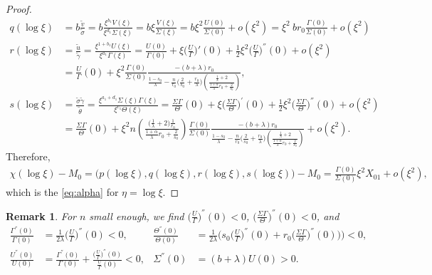 \documentclass[a4paper,11pt]{article}
\def\tg{{\tilde{\gamma}}}
\def\tv{{\tilde{v}}}
\def\tth{{\tilde{\theta}}}
\def\ts{{\tilde{\sigma}}}
\def\tu{{\tilde{u}}}
\newtheorem{remark}{Remark}[section]
\begin{document}
\begin{proof}
\begin{align*}
 q(\log\xi) &= b\frac{\tv}{\ts} = b\frac{ \xi^{b_1} V(\xi) }{ \xi^{d_1} \Sigma(\xi)} = b\xi\frac{ V(\xi) }{ \Sigma(\xi)} = b\xi^2 \frac{U(0)}{\Sigma(0)}+ o(\xi^2)=\xi^2 ~br_0\frac{\Gamma(0)}{\Sigma(0)} + o(\xi^2) \\
 r(\log\xi) &= \frac{\tu}{ \tg } = \frac{ \xi^{1+b_1}U(\xi) }{ \xi^{a_1}\Gamma(\xi) } = \frac{ U(0) }{ \Gamma(0) }+ \xi \Big(\frac{U}{\Gamma}\Big)'(0) + \frac{1}{2}\xi^2\Big(\frac{U}{\Gamma}\Big)^{''}(0) + o(\xi^2)\\
  &=\frac{ U }{ \Gamma }(0) + \xi^2\frac{\Gamma(0)}{\Sigma(0)} \frac{-(b+\lambda)r_0}{\frac{1-s_0}{\lambda}-\frac{n}{r_0}\Big(\frac{2}{s_0} + \frac{r_0}{\lambda}\Big)\left(\frac{ \frac{1}{\lambda}+2}{ \frac{1+\alpha}{\lambda}r_0 + \frac{2}{s_0}}\right)} ,\\
 s(\log\xi) &= \frac{\ts\tg}{\tth} = \frac{ \xi^{a_1+d_1}\Sigma(\xi)\Gamma(\xi) }{\xi^{c_1} \Theta(\xi)} = \frac{ \Sigma\Gamma }{\Theta}(0) + \xi \Big(\frac{ \Sigma\Gamma }{\Theta}\Big)^{'}(0) + \frac{1}{2}\xi^2\Big(\frac{ \Sigma\Gamma }{\Theta}\Big)^{''}(0) + o(\xi^2)\\
 &=\frac{ \Sigma\Gamma }{\Theta}(0) + \xi^2 n \left(\frac{ \big(\frac{1}{\lambda}+2\big) \frac{1}{r_0} }{ \frac{1+\alpha}{\lambda}r_0 + \frac{2}{s_0}}\right)\frac{\Gamma(0)}{\Sigma(0)} \frac{-(b+\lambda)r_0}{\frac{1-s_0}{\lambda}-\frac{n}{r_0}\Big(\frac{2}{s_0} + \frac{r_0}{\lambda}\Big)\left(\frac{ \frac{1}{\lambda}+2}{ \frac{1+\alpha}{\lambda}r_0 + \frac{2}{s_0}}\right)}+ o(\xi^2).
\end{align*}
Therefore,
\begin{align*}
\chi(\log\xi)-M_0  = \big(p(\log\xi),q(\log\xi),r(\log\xi),s(\log\xi)\big) -M_0 =  \frac{\Gamma(0)}{\Sigma(0)}\xi^2 X_{01} + o(\xi^2),
\end{align*}
which is the \eqref{eq:alpha} for $\eta=\log\xi$.
\end{proof}
\begin{remark} \label{rem:signs}
For $n$ small enough, we find $\displaystyle \Big(\frac{U}{\Gamma}\Big)^{''}(0) <0$, $\displaystyle \Big(\frac{\Sigma\Gamma}{\Theta}\Big)^{''}(0) <0$, and 
\begin{equation} \label{eq:second_der}
\begin{aligned}
\frac{\Gamma^{''}(0)}{\Gamma(0)} &= \frac{1}{2\lambda}\Big(\frac{U}{\Gamma}\Big)^{''}(0) < 0, & 
\frac{\Theta^{''}(0)}{\Theta(0)} &= \frac{1}{2\lambda}\Big(s_0\Big(\frac{U}{\Gamma}\Big)^{''}(0) + r_0\Big(\frac{\Sigma\Gamma}{\Theta}\Big)^{''}(0)\Big)\Big)  < 0,\\
\frac{U^{''}(0)}{U(0)} &=\frac{\Gamma^{''}(0)}{\Gamma(0)} + \frac{ \big(\frac{U}{\Gamma}\big)^{''}(0)}{\frac{U}{\Gamma}(0)}< 0,& 
\Sigma^{''}(0)&=(b+\lambda)U(0)>0.
\end{aligned}
\end{equation}
\end{remark}
\end{document}
